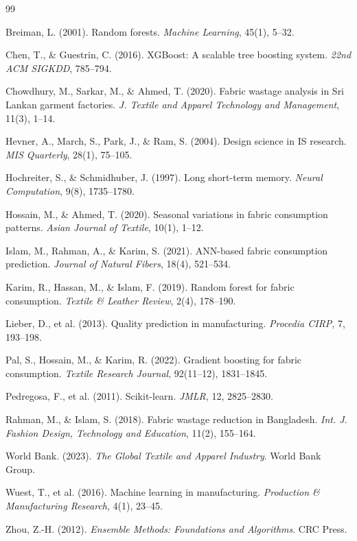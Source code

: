 \begin{thebibliography}{99}

Breiman, L. (2001). Random forests. \textit{Machine Learning}, 45(1), 5--32.

Chen, T., \& Guestrin, C. (2016). XGBoost: A scalable tree boosting system. \textit{22nd ACM SIGKDD}, 785--794.

Chowdhury, M., Sarkar, M., \& Ahmed, T. (2020). Fabric wastage analysis in Sri Lankan garment factories. \textit{J. Textile and Apparel Technology and Management}, 11(3), 1--14.

Hevner, A., March, S., Park, J., \& Ram, S. (2004). Design science in IS research. \textit{MIS Quarterly}, 28(1), 75--105.

Hochreiter, S., \& Schmidhuber, J. (1997). Long short-term memory. \textit{Neural Computation}, 9(8), 1735--1780.

Hossain, M., \& Ahmed, T. (2020). Seasonal variations in fabric consumption patterns. \textit{Asian Journal of Textile}, 10(1), 1--12.

Islam, M., Rahman, A., \& Karim, S. (2021). ANN-based fabric consumption prediction. \textit{Journal of Natural Fibers}, 18(4), 521--534.

Karim, R., Hassan, M., \& Islam, F. (2019). Random forest for fabric consumption. \textit{Textile \& Leather Review}, 2(4), 178--190.

Lieber, D., et al. (2013). Quality prediction in manufacturing. \textit{Procedia CIRP}, 7, 193--198.

Pal, S., Hossain, M., \& Karim, R. (2022). Gradient boosting for fabric consumption. \textit{Textile Research Journal}, 92(11--12), 1831--1845.

Pedregosa, F., et al. (2011). Scikit-learn. \textit{JMLR}, 12, 2825--2830.

Rahman, M., \& Islam, S. (2018). Fabric wastage reduction in Bangladesh. \textit{Int. J. Fashion Design, Technology and Education}, 11(2), 155--164.

World Bank. (2023). \textit{The Global Textile and Apparel Industry}. World Bank Group.

Wuest, T., et al. (2016). Machine learning in manufacturing. \textit{Production \& Manufacturing Research}, 4(1), 23--45.

Zhou, Z.-H. (2012). \textit{Ensemble Methods: Foundations and Algorithms}. CRC Press.

\end{thebibliography}
